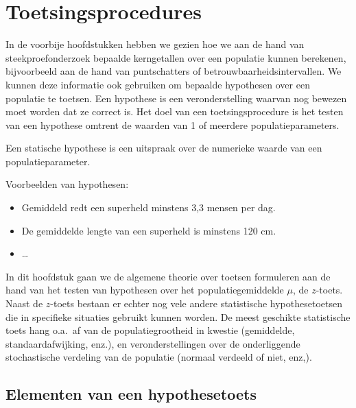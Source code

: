 \chapter{Toetsingsprocedures}

In de voorbije hoofdstukken hebben we gezien hoe we aan de hand van steekproefonderzoek bepaalde kerngetallen over een populatie kunnen berekenen, bijvoorbeeld aan de hand van puntschatters of betrouwbaarheidsintervallen. We kunnen deze informatie ook gebruiken om bepaalde hypothesen over een populatie te toetsen. Een hypothese is een veronderstelling waarvan nog bewezen moet worden dat ze correct is. Het doel van een toetsingsprocedure is het testen van een hypothese omtrent de waarden van 1 of meerdere populatieparameters.

\begin{definition}
  Een statische hypothese is een uitspraak over de numerieke waarde van een populatieparameter.
\end{definition}

Voorbeelden van hypothesen:

\begin{itemize}
  \item Gemiddeld redt een superheld minstens 3,3 mensen per dag.
  \item De gemiddelde lengte van een superheld is minstens 120 cm.
  \item \dots
\end{itemize}

In dit hoofdstuk gaan we de algemene theorie over toetsen formuleren aan de hand van het testen van hypothesen over het populatiegemiddelde $\mu$, de $z$-toets. Naast de $z$-toets bestaan er echter nog vele andere statistische hypothesetoetsen die in specifieke situaties gebruikt kunnen worden. De meest geschikte statistische toets hang o.a.~af van de populatiegrootheid in kwestie (gemiddelde, standaardafwijking, enz.), en veronderstellingen over de onderliggende stochastische verdeling van de populatie (normaal verdeeld of niet, enz,).

\section{Elementen van een hypothesetoets}
\label{sec:elementen-hypothesetoets}

